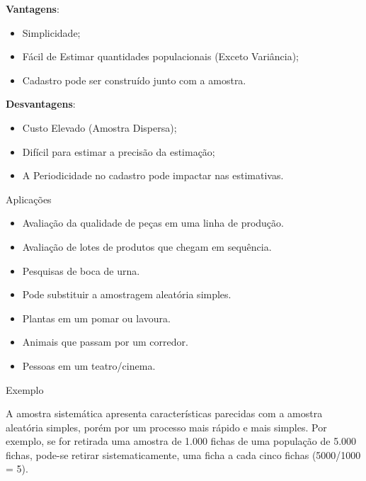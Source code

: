 \documentclass[14pt,aspectratio=1610]{beamer}
\begin{document}
\begin{frame}{}
\begin{block}{}
\justifying
\begin{minipage}[t]{0.45\textwidth}
\textbf{Vantagens}: 
\smallskip
\begin{itemize}[label={}]
    \item Simplicidade;
    \item Fácil de Estimar quantidades populacionais (Exceto Va\-riân\-cia);
    \item Cadastro pode ser construído junto com a amostra.
\end{itemize}
\end{minipage}%
\begin{minipage}[t]{0.5\textwidth}
\textbf{Desvantagens}:
\smallskip
\begin{itemize}[label={}]
    \item Custo Elevado (Amostra Dispersa);
    \item Difícil para estimar a precisão da estimação;
    \item A Periodicidade no cadastro pode impactar nas estimativas.
\end{itemize}
\end{minipage}
\end{block}
\end{frame}

\begin{frame}{Aplicações}
    \begin{block}{}
    \justifying
\begin{itemize}[label={}]
\item Avaliação da qualidade de peças em uma linha de produção.\pause
\item Avaliação de lotes de produtos que chegam em sequência.\pause
\item Pesquisas de boca de urna.\pause
\item Pode substituir a amostragem aleatória simples.\pause
\item Plantas em um pomar ou lavoura.\pause
\item Animais que passam por um corredor.\pause
\item Pessoas em um teatro/cinema.
\end{itemize}
    \end{block}
\end{frame}


\begin{frame}{Exemplo}
    \begin{block}{}
    \justifying
A amostra sistemática apresenta características parecidas com a amostra
aleatória simples, porém por um processo mais rápido e mais simples. Por exemplo, se for retirada uma amostra de 1.000 fichas de uma população de 5.000 fichas, pode-se retirar sistematicamente, uma ficha a cada cinco fichas (5000/1000 = 5).
    \end{block}
\end{frame}
\end{document}
